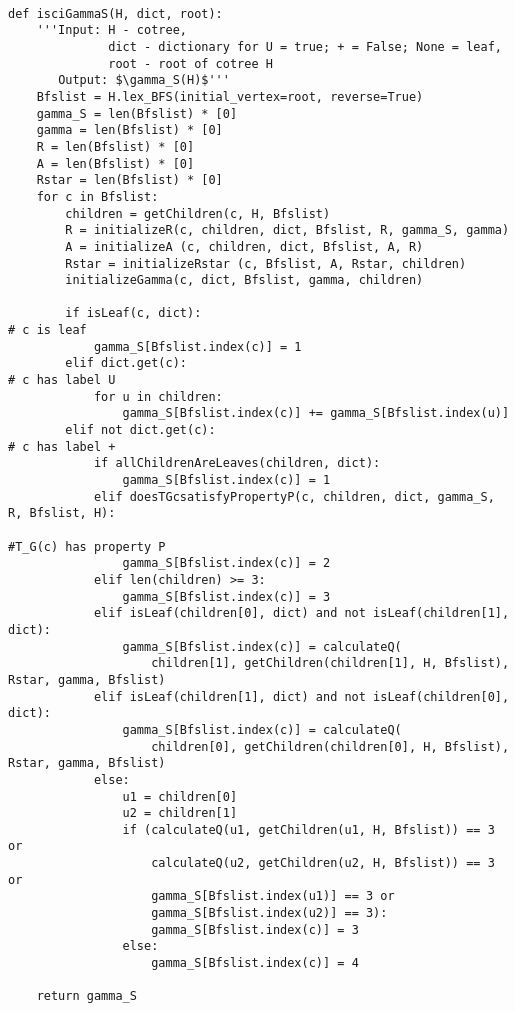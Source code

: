 \documentclass[12pt,a4paper,twoside]{article}
\theoremstyle{definition} %
\theoremstyle{plain} %
\numberwithin{equation}{section}  %
\begin{document}
\begin{verbatim}

def isciGammaS(H, dict, root):
    '''Input: H - cotree, 
              dict - dictionary for U = true; + = False; None = leaf,
              root - root of cotree H
       Output: $\gamma_S(H)$'''
    Bfslist = H.lex_BFS(initial_vertex=root, reverse=True)
    gamma_S = len(Bfslist) * [0]
    gamma = len(Bfslist) * [0]
    R = len(Bfslist) * [0]
    A = len(Bfslist) * [0]
    Rstar = len(Bfslist) * [0]
    for c in Bfslist:
        children = getChildren(c, H, Bfslist)
        R = initializeR(c, children, dict, Bfslist, R, gamma_S, gamma)
        A = initializeA (c, children, dict, Bfslist, A, R)
        Rstar = initializeRstar (c, Bfslist, A, Rstar, children)
        initializeGamma(c, dict, Bfslist, gamma, children)
        
        if isLeaf(c, dict):                                             # c is leaf
            gamma_S[Bfslist.index(c)] = 1
        elif dict.get(c):                                               # c has label U
            for u in children:
                gamma_S[Bfslist.index(c)] += gamma_S[Bfslist.index(u)]
        elif not dict.get(c):                                           # c has label +
            if allChildrenAreLeaves(children, dict):
                gamma_S[Bfslist.index(c)] = 1
            elif doesTGcsatisfyPropertyP(c, children, dict, gamma_S, R, Bfslist, H):
                                                                        #T_G(c) has property P
                gamma_S[Bfslist.index(c)] = 2
            elif len(children) >= 3:
                gamma_S[Bfslist.index(c)] = 3
            elif isLeaf(children[0], dict) and not isLeaf(children[1], dict):
                gamma_S[Bfslist.index(c)] = calculateQ(
                    children[1], getChildren(children[1], H, Bfslist), Rstar, gamma, Bfslist)
            elif isLeaf(children[1], dict) and not isLeaf(children[0], dict):
                gamma_S[Bfslist.index(c)] = calculateQ(
                    children[0], getChildren(children[0], H, Bfslist), Rstar, gamma, Bfslist)
            else:
                u1 = children[0]
                u2 = children[1]
                if (calculateQ(u1, getChildren(u1, H, Bfslist)) == 3 or
                    calculateQ(u2, getChildren(u2, H, Bfslist)) == 3 or
                    gamma_S[Bfslist.index(u1)] == 3 or
                    gamma_S[Bfslist.index(u2)] == 3):
                    gamma_S[Bfslist.index(c)] = 3
                else:
                    gamma_S[Bfslist.index(c)] = 4
                                                                                 
    return gamma_S

\end{verbatim}
\pagebreak
\end{document}
